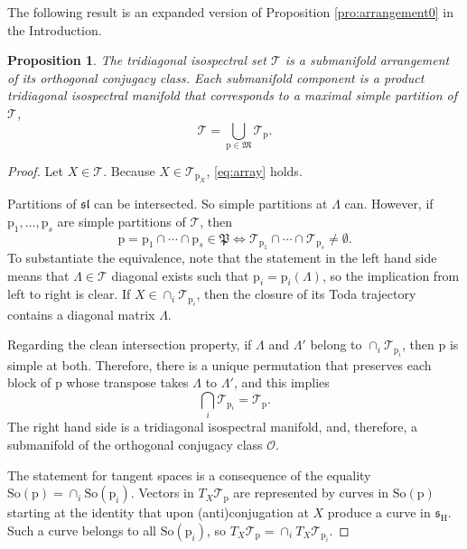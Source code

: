 \documentclass[reqno]{amsart}
\newcommand{\p}{\mathrm{p}}
\renewcommand{\ss}{\mathfrak{s}}
\renewcommand{\sl}{\mathfrak{sl}}
\newcommand{\cO}{\mathcal{O}}
\newcommand{\cT}{\mathcal{T}}
\newcommand{\So}{\mathrm{So}}
\renewcommand{\H}{\mathrm{H}}
\newtheorem{proposition}[theorem]{Proposition}
\begin{document}
The following result is an expanded version of Proposition \ref{pro:arrangement0} in the Introduction.
\begin{proposition}\label{lem:arrangement} The tridiagonal isospectral set $\cT$ is a submanifold arrangement of its orthogonal conjugacy class. Each submanifold component is a product tridiagonal isospectral manifold that corresponds to a maximal simple partition of $\cT$,
 \begin{equation}\label{eq:array}\cT=\bigcup_{\p\in \mathfrak{M}}\cT_{\p}.
  \end{equation}
\end{proposition}
\begin{proof}
 Let $X\in \cT$. Because $X\in \cT_{\p_X}$,
 \eqref{eq:array} holds.

Partitions of $\sl$ can be intersected. So simple partitions at $\Lambda$ can. However, if $\p_1,\dots,\p_s$ are simple partitions of $\cT$, then
\[\p=\p_1\cap \cdots \cap \p_s\in \mathfrak{P}\Longleftrightarrow \cT_{\p_1}\cap\cdots \cap \cT_{\p_s}\neq \emptyset.\]
To substantiate the equivalence, note that the statement in the left hand side means that $\Lambda\in \cT$ diagonal exists such that $\p_i=\p_i(\Lambda)$, so the implication from left to right is clear. If $X\in \cap_i\cT_{\p_i}$, then the closure of its Toda trajectory contains a diagonal matrix $\Lambda$.

Regarding the clean intersection property,  if $\Lambda$ and $\Lambda'$ belong to $\cap_i\cT_{\p_i}$, then $\p$ is simple at both. Therefore,  there is a unique permutation that preserves each block of $\p$ whose transpose takes   $\Lambda$ to $\Lambda'$, and this implies
\[\bigcap_i\cT_{\p_i}=\cT_{\p}.\]
The right hand side is a tridiagonal isospectral manifold, and, therefore, a submanifold of the orthogonal conjugacy class $\cO$.

The statement for tangent spaces is a consequence of the equality $\So(\p)=\cap_i \So(\p_i)$.  Vectors in $T_X\cT_{\p}$ are represented by curves in $\So(\p)$ starting at the identity that upon (anti)conjugation at $X$ produce a curve in $\ss_\H$. Such a curve  belongs  to all $\So(\p_i)$, so
$T_X\cT_\p= \cap_i T_X\cT_{\p_i}$.
\end{proof}
\end{document}
